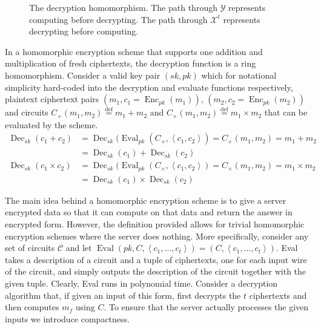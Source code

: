 \begin{figure}
    
    \caption{The decryption homomorphism. The path through $\mathcal{Y}$ represents computing before decrypting. The path through $\mathcal{X}^t$ represents decrypting before computing.}
    \label{fig:homomorphism}
\end{figure}

In a homomorphic encryption scheme that supports one addition and multiplication of fresh ciphertexts, the decryption function is a ring homomorphism. Consider a valid key pair $(sk,pk)$ which for notational simplicity hard-coded into the decryption and evaluate functions respectively, plaintext ciphertext pairs $(m_1,c_1 = \operatorname{Enc}_{pk}(m_1))$, $(m_2, c_2 = \operatorname{Enc}_{pk}(m_2))$ and circuits $C_+(m_1,m_2) \stackrel{\mathrm{def}}{=} m_1 + m_2$ and $C_{\times}(m_1,m_2) \stackrel{\mathrm{def}}{=} m_1 \times m_2$ that can be evaluated by the scheme. 
\begin{equation*}
\begin{aligned}
\operatorname{Dec}_{sk}(c_1 + c_2) &= \operatorname{Dec}_{sk}(\operatorname{Eval}_{pk}(C_+,\left\langle c_1,c_2 \right \rangle) = C_+(m_1,m_2) = m_1 + m_2 \\
    & = \operatorname{Dec}_{sk}(c_1) + \operatorname{Dec}_{sk}(c_2)\\
\operatorname{Dec}_{sk}(c_1 \times c_2) &= \operatorname{Dec}_{sk}(\operatorname{Eval}_{pk}(C_{\times},\left\langle c_1,c_2 \right \rangle) = C_{\times}(m_1,m_2) = m_1 \times m_2 \\
    & = \operatorname{Dec}_{sk}(c_1) \times \operatorname{Dec}_{sk}(c_2)
\end{aligned}
\end{equation*}

The main idea behind a homomorphic encryption scheme is to give a server encrypted data so that it can compute on that data and return the answer in encrypted form. However, the definition provided allows for trivial homomorphic encryption schemes where the server does nothing. More specifically, consider any set of circuits $\mathcal{C}$ and let $\operatorname{Eval}(pk, C,\left\langle c_1, \dots ,c_t \right\rangle) = (C, \left\langle c_1, \dots, c_t \right \rangle)$. Eval takes a description of a circuit and a tuple of ciphertexts, one for each input wire of the circuit, and simply outputs the description of the circuit together with the given tuple. Clearly, Eval runs in polynomial time. Consider a decryption algorithm that, if given an input of this form, first decrypts the $t$ ciphertexts and then computes $m_f$ using $C$. To ensure that the server actually processes the given inputs we introduce compactness.

